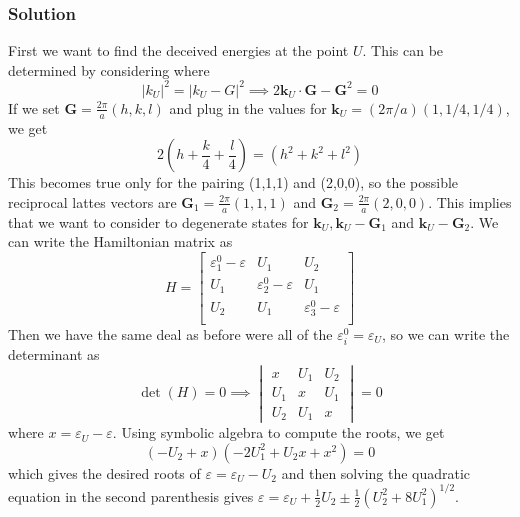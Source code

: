 \documentclass[12pt]{article}
\begin{document}
\subsubsection{Solution}
First we want to find the deceived energies at the point $U$. This can be determined by considering where
\begin{equation}
    |k_U|^2 = |k_U - G|^2 \implies 2\mathbf{k}_U \cdot \mathbf{G} - \mathbf{G}^2 = 0
\end{equation}
If we set $\mathbf{G} = \frac{2\pi}{a}(h,k,l)$ and plug in the values for $\mathbf{k}_U=(2\pi/a)(1,1/4,1/4)$, we get
\begin{equation}
    2\left(h + \frac{k}{4} + \frac{l}{4}\right) = \left(h^2 + k^2 + l^2\right)
\end{equation}
This becomes true only for the pairing (1,1,1) and (2,0,0), so the possible reciprocal lattes vectors are $\mathbf{G}_1 = \frac{2\pi}{a}(1,1,1)$ and $\mathbf{G}_2 = \frac{2\pi}{a}(2,0,0)$. This implies that we want to consider to degenerate states for $\mathbf{k}_U, \mathbf{k}_U - \mathbf{G}_1$ and $\mathbf{k}_U - \mathbf{G}_2$. We can write the Hamiltonian matrix as
\begin{equation}
H=
    \begin{bmatrix}
        \varepsilon_1^0 - \varepsilon & U_1 & U_2 \\
        U_1 & \varepsilon_2^0 - \varepsilon & U_1 \\
        U_2 & U_1 & \varepsilon_3^0 - \varepsilon \\
    \end{bmatrix}
\end{equation}
Then we have the same deal as before were all of the $\varepsilon_i^0 = \varepsilon_U$, so we can write the determinant as
\begin{equation}
\det(H) = 0 \implies \begin{vmatrix}
        x & U_1 & U_2 \\
        U_1 & x & U_1 \\
        U_2 & U_1 & x
    \end{vmatrix} = 0
\end{equation}
where $x = \varepsilon_U - \varepsilon$. Using symbolic algebra to compute the roots, we get
\begin{equation}
    \left(- U_{2} + x\right) \left(- 2 U_{1}^{2} + U_{2} x + x^{2}\right) = 0
\end{equation}
which gives the desired roots of $\varepsilon = \varepsilon_U - U_2$ and then solving the quadratic equation in the second parenthesis gives $\varepsilon = \varepsilon_U + \frac{1}{2}U_2 \pm \frac{1}{2}\left(U_2^2 + 8U_1^2\right)^{1/2}$.
\end{document}

